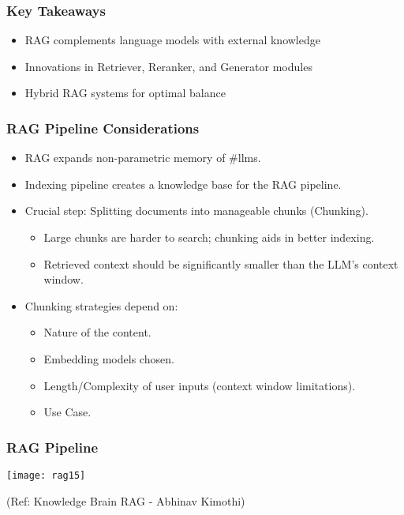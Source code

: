 \begin{frame}[fragile]\frametitle{Key Takeaways}
  \begin{itemize}
    \item RAG complements language models with external knowledge
    \item Innovations in Retriever, Reranker, and Generator modules
    \item Hybrid RAG systems for optimal balance
  \end{itemize}
\end{frame}


\begin{frame}[fragile]\frametitle{RAG Pipeline Considerations}
    \begin{itemize}
        \item RAG expands non-parametric memory of \#llms.
        \item Indexing pipeline creates a knowledge base for the RAG pipeline.
        \item Crucial step: Splitting documents into manageable chunks (Chunking).
            \begin{itemize}
                \item Large chunks are harder to search; chunking aids in better indexing.
                \item Retrieved context should be significantly smaller than the LLM's context window.
            \end{itemize}
        \item Chunking strategies depend on:
            \begin{itemize}
                \item Nature of the content.
                \item Embedding models chosen.
                \item Length/Complexity of user inputs (context window limitations).
                \item Use Case.
            \end{itemize}
    \end{itemize}
\end{frame}


\begin{frame}[fragile]\frametitle{RAG Pipeline}

	\begin{center}
	\texttt{[image: rag15]}
	\end{center}

	{\tiny (Ref: Knowledge Brain RAG - Abhinav  Kimothi)}

\end{frame}




